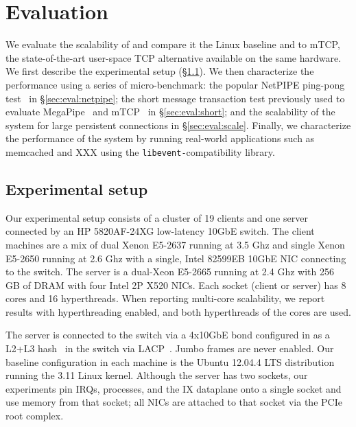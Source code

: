 
\section{Evaluation}
\label{sec:eval}

We evaluate the scalability of \ix and compare it the Linux baseline
and to mTCP, the state-of-the-art user-space TCP alternative available
on the same hardware.  We first describe the experimental setup
(\S\ref{sec:eval:setup}).  We then characterize the performance using
a series of micro-benchmark: the popular NetPIPE ping-pong
test~\cite{snell1996netpipe} in \S\ref{sec:eval:netpipe}; the short
message transaction test previously used to evaluate
MegaPipe~\cite{han2012megapipe} and mTCP~\cite{jeong2014mtcp} in
\S\ref{sec:eval:short}; and the scalability of the system for large
persistent connections in \S\ref{sec:eval:scale}.  Finally, we
characterize the performance of the \ix system by running real-world
applications such as memcached and XXX using the
\texttt{libevent-}compatibility library.


\subsection{Experimental setup}
\label{sec:eval:setup}


Our experimental setup consists of a cluster of 19 clients and one
server connected by an HP 5820AF-24XG low-latency 10GbE switch.  The client
machines are a mix of dual Xenon E5-2637 running at 3.5 Ghz and single Xenon E5-2650 running at 2.6 Ghz with a single, Intel
82599EB 10GbE NIC connecting to the switch.  The server is a dual-Xeon E5-2665
running at 2.4 Ghz with 256 GB of DRAM with four Intel 2P X520 NICs.  Each
socket (client or server) has 8 cores and 16 hyperthreads.  When
reporting multi-core scalability, we report results with
hyperthreading enabled, and both hyperthreads of the cores are used.

The server is connected to
the switch via a 4x10GbE bond configured in as a L2+L3
hash~\cite{missing} in the switch via LACP~\cite{ieee802.3ad}.  Jumbo
frames are never enabled.  Our baseline configuration in each machine
is the Ubuntu 12.04.4 LTS distribution running the 3.11 Linux kernel.  Although
the server has two sockets, our experiments pin IRQs, processes, and
the IX dataplane onto a single socket and use memory from that socket;
all NICs are attached to that socket via the PCIe root complex.

